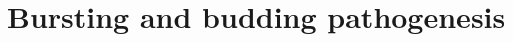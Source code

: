 
\chapter{Bursting and budding pathogenesis}
\label{path:ch:pathogenesis}








\begingroup
\omitfromtoc
\renewcommand{\theHsection}{\thechapter.appendix.\Alph{section}}
\renewcommand{\theHsubsection}{\theHsection.\arabic{subsection}}
\renewcommand{\theHsubsubsection}{\theHsubsection.\arabic{subsubsection}}


\endgroup
\restoretoc
